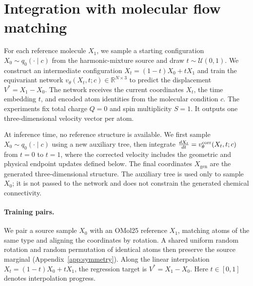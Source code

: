 \documentclass{article}
\newcommand{\HH}{\mathcal H}
\newcommand{\RR}{\mathbb R}
\begin{document}
\section{Integration with molecular flow matching}\label{sec:flow}
For each reference molecule $X_1$, we sample a starting configuration $X_0\sim q_0(\cdot\mid c)$ from the harmonic-mixture source and draw $t\sim\mathcal U(0,1)$. We construct an intermediate configuration $X_t=(1-t)X_0+tX_1$ and train the equivariant network $v_\theta(X_t,t;c)\in\mathbb R^{N\times3}$ to predict the displacement $V^\ast=X_1-X_0$. The network receives the current coordinates $X_t$, the time embedding $t$, and encoded atom identities from the molecular condition $c$. The experiments fix total charge $Q=0$ and spin multiplicity $S=1$. It outputs one three-dimensional velocity vector per atom.

At inference time, no reference structure is available. We first sample $X_0\sim q_0(\cdot\mid c)$ using a new auxiliary tree, then integrate $\frac{dX_t}{dt}=v_\theta^{\rm corr}(X_t,t;c)$ from $t=0$ to $t=1$, where the corrected velocity includes the geometric and physical endpoint updates defined below. The final coordinates $X_{\mathrm{gen}}$ are the generated three-dimensional structure. The auxiliary tree is used only to sample $X_0$; it is not passed to the network and does not constrain the generated chemical connectivity.


\paragraph{Training pairs.}
We pair a source sample $X_0$ with an OMol25 reference $X_1$, matching atoms of the same type and aligning the coordinates by rotation. A shared uniform random rotation and random permutation of identical atoms then preserve the source marginal (Appendix~\ref{app:symmetry}). Along the linear interpolation $X_t=(1-t)X_0+tX_1$, the regression target is $V^*=X_1-X_0$. Here $t\in[0,1]$ denotes interpolation progress.
\end{document}
